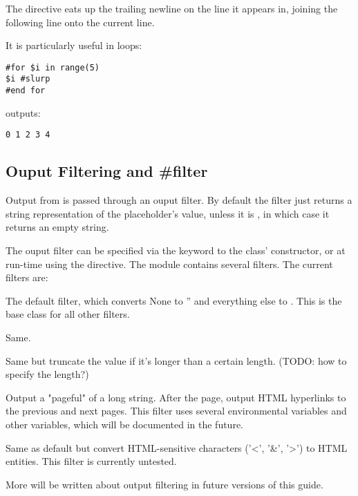 The  directive eats up the trailing newline on the line it
appears in, joining the following line onto the current line.


It is particularly useful in  loops:
\begin{verbatim}
#for $i in range(5)
$i #slurp
#end for
\end{verbatim}
outputs:
\begin{verbatim}
0 1 2 3 4
\end{verbatim}


\subsection{Ouput Filtering and \#filter}
\label{output.filter}

Output from  is passed through an ouput filter.  By default
the filter just returns a string representation of the placeholder's value,
unless it is , in which case it returns an empty string. 

The ouput filter can be specified via the  keyword to the
 class' constructor, or at run-time using the 
directive. The  module contains several filters.
The current filters are:

\begin{description}
\item{}
     The default filter, which converts None to '' and everything else to
     .  This is the base class for all other filters.
\item{}
     Same.
\item{}
     Same but truncate the value if it's longer than a certain length.
     (TODO: how to specify the length?)
\item{}
     Output a "pageful" of a long string.  After the page, output HTML
     hyperlinks to the previous and next pages.  This filter uses several
     environmental variables and other variables, which will be documented in
     the future.
\item{}
     Same as default but convert HTML-sensitive characters ('<', '\&', '>')
     to HTML entities.  This filter is currently untested.
\end{description}

More will be written about output filtering in future versions of this guide.




